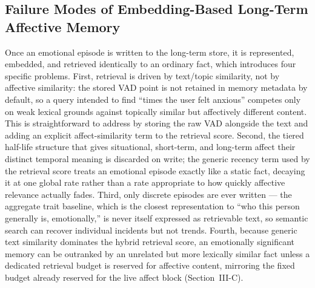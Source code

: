 \documentclass[graybox]{svmult}
\begin{document}
\subsection{Failure Modes of Embedding-Based Long-Term Affective Memory}
Once an emotional episode is written to the long-term store, it is
represented, embedded, and retrieved identically to an ordinary fact,
which introduces four specific problems. First, retrieval is driven by
text/topic similarity, not by affective similarity: the stored VAD point
is not retained in memory metadata by default, so a query intended to
find ``times the user felt anxious'' competes only on weak lexical
grounds against topically similar but affectively different content.
This is straightforward to address by storing the raw VAD alongside the
text and adding an explicit affect-similarity term to the retrieval
score. Second, the tiered half-life structure that gives situational,
short-term, and long-term affect their distinct temporal meaning is
discarded on write; the generic recency term used by the retrieval score
treats an emotional episode exactly like a static fact, decaying it at
one global rate rather than a rate appropriate to how quickly affective
relevance actually fades. Third, only discrete episodes are ever written
--- the aggregate trait baseline, which is the closest representation to
``who this person generally is, emotionally,'' is never itself expressed
as retrievable text, so semantic search can recover individual incidents
but not trends. Fourth, because generic text similarity dominates the
hybrid retrieval score, an emotionally significant memory can be
outranked by an unrelated but more lexically similar fact unless a
dedicated retrieval budget is reserved for affective content, mirroring
the fixed budget already reserved for the live affect block
(Section~III-C).
\end{document}

